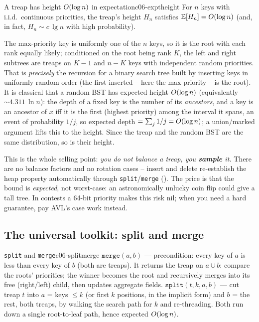 \begin{theorem}{A treap has height $O(\log n)$ in expectation}{c06-exptheight}
For $n$ keys with i.i.d.\ continuous priorities, the treap's height $H_n$ satisfies
$\mathbb{E}[H_n] = O(\log n)$ (and, in fact, $H_n \sim c\,\lg n$ with high probability).
\end{theorem}
\begin{proofbox}
The max-priority key is uniformly one of the $n$ keys, so it is the root with each rank equally likely;
conditioned on the root being rank $K$, the left and right subtrees are treaps on $K-1$ and $n-K$ keys
with independent random priorities. That is \emph{precisely} the recursion for a binary search tree built
by inserting keys in uniformly random order (the first inserted -- here the max priority -- is the root).
It is classical that a random BST has expected height $O(\log n)$ (equivalently $\sim 4.311\,\ln n$):
the depth of a fixed key is the number of its \emph{ancestors}, and a key is an ancestor of $x$ iff it is
the first (highest priority) among the interval it spans, an event of probability $1/j$, so expected depth
$= \sum_j 1/j = O(\log n)$; a union/marked argument lifts this to the height. Since the treap and the
random BST are the same distribution, so is their height. \end{proofbox}
\begin{insightbox}
This is the whole selling point: \emph{you do not balance a treap, you \textbf{sample} it.} There are no
balance factors and no rotation cases -- insert and delete re-establish the heap property automatically
through \texttt{split}/\texttt{merge} (). The price is that the bound is
\emph{expected}, not worst-case: an astronomically unlucky coin flip could give a tall tree. In contests a
64-bit priority makes this risk nil; when you need a hard guarantee, pay AVL's case work instead.
\end{insightbox}

\subsection{The universal toolkit: split and merge}

\begin{definition}{\texttt{split} and \texttt{merge}}{c06-splitmerge}
\emph{$\texttt{merge}(a,b)$} --- precondition: every key of $a$ is less than every key of $b$ (both are
treaps). It returns the treap on $a\cup b$: compare the roots' priorities; the winner becomes the root and
recursively merges into its free (right/left) child, then updates aggregate fields.
\emph{$\texttt{split}(t,k,a,b)$} --- cut treap $t$ into $a$ = keys $\le k$ (or first $k$ positions, in the
implicit form) and $b$ = the rest, both treaps, by walking the search path for $k$ and re-threading.
Both run down a single root-to-leaf path, hence expected $O(\log n)$.
\end{definition}


